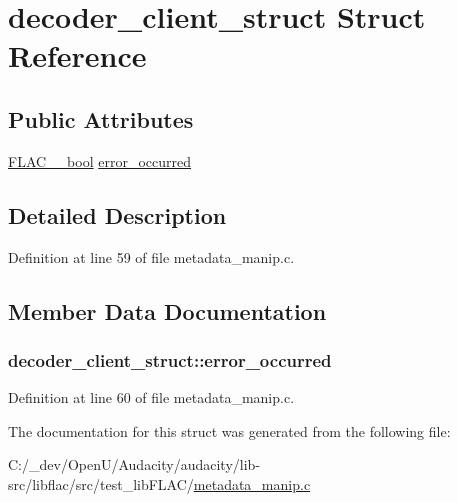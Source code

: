 \hypertarget{structdecoder__client__struct}{}\section{decoder\+\_\+client\+\_\+struct Struct Reference}
\label{structdecoder__client__struct}
\subsection*{Public Attributes}
\begin{DoxyCompactItemize}
\item 
\hyperlink{ordinals_8h_a95103469f1cbd78b8cf250194985b34e}{F\+L\+A\+C\+\_\+\+\_\+bool} \hyperlink{structdecoder__client__struct_aa2c8d28bb0dc85e694b3f2d8131dd59a}{error\+\_\+occurred}
\end{DoxyCompactItemize}


\subsection{Detailed Description}


Definition at line 59 of file metadata\+\_\+manip.\+c.



\subsection{Member Data Documentation}
\subsubsection[{\texorpdfstring{error\+\_\+occurred}{error_occurred}}]{ decoder\+\_\+client\+\_\+struct\+::error\+\_\+occurred}\hypertarget{structdecoder__client__struct_aa2c8d28bb0dc85e694b3f2d8131dd59a}{}\label{structdecoder__client__struct_aa2c8d28bb0dc85e694b3f2d8131dd59a}


Definition at line 60 of file metadata\+\_\+manip.\+c.



The documentation for this struct was generated from the following file\+:\begin{DoxyCompactItemize}
\item 
C\+:/\+\_\+dev/\+Open\+U/\+Audacity/audacity/lib-\/src/libflac/src/test\+\_\+lib\+F\+L\+A\+C/\hyperlink{metadata__manip_8c}{metadata\+\_\+manip.\+c}\end{DoxyCompactItemize}
